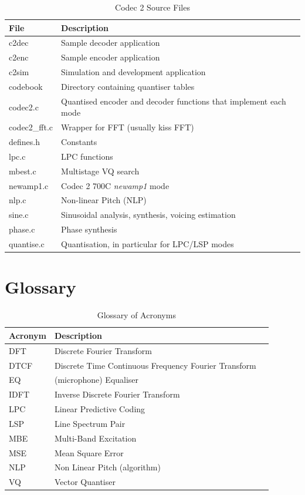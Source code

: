 \documentclass{article}
\begin{document}
{\begin{table}[H]
\label{tab:codec2_file}
\centering
\begin{tabular}{l l}
\hline
File & Description \\
\hline
c2dec & Sample decoder application \\
c2enc & Sample encoder application \\
c2sim & Simulation and development application \\
codebook & Directory containing quantiser tables \\
codec2.c & Quantised encoder and decoder functions that implement each mode \\
codec2\_fft.c & Wrapper for FFT (usually kiss FFT) \\
defines.h & Constants \\
lpc.c & LPC functions \\
mbest.c & Multistage VQ search \\
newamp1.c & Codec 2 700C \emph{newamp1} mode \\
nlp.c & Non-linear Pitch (NLP) \\
sine.c & Sinusoidal analysis, synthesis, voicing estimation \\
phase.c & Phase synthesis \\
quantise.c & Quantisation, in particular for LPC/LSP modes \\
\hline
\end{tabular}
\caption{Codec 2 Source Files}
\end{table}

\section{Glossary}
\label{sect:glossary}

\begin{table}[H]
\label{tab:acronyms}
\centering
\begin{tabular}{l l l }
\hline
Acronym & Description \\
\hline
DFT & Discrete Fourier Transform \\
DTCF & Discrete Time Continuous Frequency Fourier Transform \\
EQ & (microphone) Equaliser \\
IDFT & Inverse Discrete Fourier Transform \\
LPC & Linear Predictive Coding \\
LSP & Line Spectrum Pair \\
MBE & Multi-Band Excitation \\
MSE & Mean Square Error \\
NLP & Non Linear Pitch (algorithm) \\
VQ & Vector Quantiser \\
\hline
\end{tabular}
\caption{Glossary of Acronyms}
\end{table}

}
\end{document}
